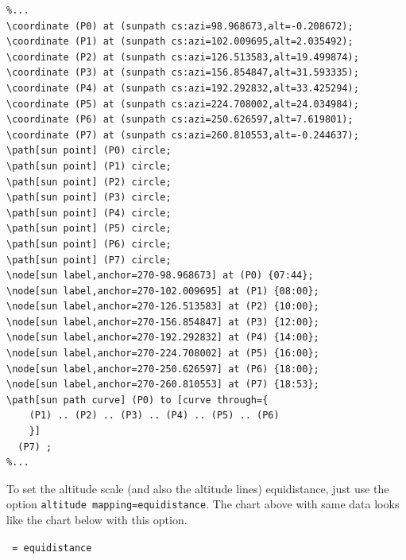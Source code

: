 \begin{verbatim}
%...
\coordinate (P0) at (sunpath cs:azi=98.968673,alt=-0.208672);
\coordinate (P1) at (sunpath cs:azi=102.009695,alt=2.035492);
\coordinate (P2) at (sunpath cs:azi=126.513583,alt=19.499874);
\coordinate (P3) at (sunpath cs:azi=156.854847,alt=31.593335);
\coordinate (P4) at (sunpath cs:azi=192.292832,alt=33.425294);
\coordinate (P5) at (sunpath cs:azi=224.708002,alt=24.034984);
\coordinate (P6) at (sunpath cs:azi=250.626597,alt=7.619801);
\coordinate (P7) at (sunpath cs:azi=260.810553,alt=-0.244637);
\path[sun point] (P0) circle;
\path[sun point] (P1) circle;
\path[sun point] (P2) circle;
\path[sun point] (P3) circle;
\path[sun point] (P4) circle;
\path[sun point] (P5) circle;
\path[sun point] (P6) circle;
\path[sun point] (P7) circle;
\node[sun label,anchor=270-98.968673] at (P0) {07:44};
\node[sun label,anchor=270-102.009695] at (P1) {08:00};
\node[sun label,anchor=270-126.513583] at (P2) {10:00};
\node[sun label,anchor=270-156.854847] at (P3) {12:00};
\node[sun label,anchor=270-192.292832] at (P4) {14:00};
\node[sun label,anchor=270-224.708002] at (P5) {16:00};
\node[sun label,anchor=270-250.626597] at (P6) {18:00};
\node[sun label,anchor=270-260.810553] at (P7) {18:53};
\path[sun path curve] (P0) to [curve through={ 
    (P1) .. (P2) .. (P3) .. (P4) .. (P5) .. (P6) 
    }] 
  (P7) ;
%...
\end{verbatim}

To set the altitude scale (and also the altitude lines) equidistance, just use the option \verb|altitude mapping=equidistance|.
The chart above with same data looks like the chart below with this option.

 \texttt{ = equidistance}

